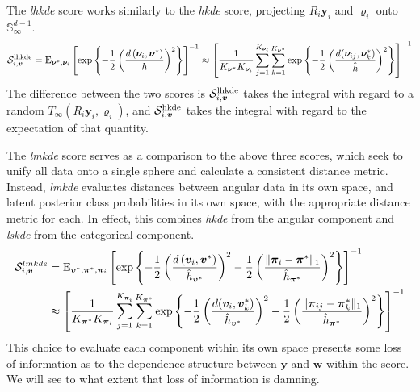     The \emph{lhkde} score works similarly to the \emph{hkde} score, projecting
    $R_i\bm{y}_i$ and $\bm{\varrho}_i$ onto $\mathbb{S}_{\infty}^{d-1}$.  
    \begin{equation}
        \label{eqn:adlhkdecat}
    \mathcal{S}_{i,\bm{v}}^{\text{lhkde}} = \text{E}_{\bm{\nu}^*,\bm{\nu}_i}
        \left[\exp\left\lbrace-\frac{1}{2}\left(
            \frac{d\left(\bm{\nu}_i, \bm{\nu}^*\right)}{h}\right)^2
        \right\rbrace\right]^{-1}
        \approx \left[
        \frac{1}{K_{\bm{\nu}^*}K_{\bm{\nu}_i}}
        \sum_{j = 1}^{K_{\bm{\nu}_i}}\sum_{k=1}^{K_{\bm{\nu}^*}}
        \exp\left\lbrace
        -\frac{1}{2}\left(\frac{d(\bm{\nu}_{ij},\bm{\nu}_k^*)}{\hat{h}}\right)^2
        \right\rbrace\right]^{-1}
    \end{equation}
    The difference between the two scores is $\mathcal{S}_{i,\bm{v}}^{\text{lhkde}}$
    takes the integral with regard to a random 
    $T_{\infty}(R_i\bm{y}_i,\bm{\varrho}_i)$, and $\mathcal{S}_{i,\bm{v}}^{\text{hkde}}$ 
    takes the integral with regard to the expectation of that quantity.

The \emph{lmkde} score serves as a comparison to the above three scores, 
    which seek to unify all data onto a single sphere and calculate a 
    consistent distance metric.  Instead, \emph{lmkde} evaluates distances 
    between angular data in its own space, and latent posterior class 
    probabilities in its own space, with the appropriate distance metric for 
    each.  In effect, this combines \emph{hkde} from
    the angular component and \emph{lskde} from the categorical component.
    \begin{equation}
    \label{eqn:lmkdecat}
    \begin{aligned}
    \mathcal{S}_{i,\bm{v}}^{lmkde} &= \text{E}_{\bm{v}^*,\bm{\pi}^*,\bm{\pi}_i}\left[
        \exp
        \left\lbrace 
        -\frac{1}{2}
        \left(
        \frac{d\left(\bm{v}_i, \bm{v}^*\right)}{\hat{h}_{\bm{v}^*}}
        \right)^2
        -\frac{1}{2}
        \left(
        \frac{\lVert\bm{\pi}_i - \bm{\pi}^*\rVert_1}{\hat{h}_{\bm{\pi}^*}}
        \right)^2
        \right\rbrace
        \right]^{-1}\\
        &\approx \left[\frac{1}{K_{\bm{\pi}^*}K_{\bm{\pi}_i}}
            \sum_{j = 1}^{K_{\bm{\pi}_i}}\sum_{k=1}^{K_{\bm{\pi}^*}}
            \exp\left\lbrace-\frac{1}{2}
            \left(\frac{d(\bm{v}_i,\bm{v}_k^*)}{\hat{h}_{\bm{v}^*}}\right)^2
            -\frac{1}{2}\left(
            \frac{\lVert\bm{\pi}_{ij} - \bm{\pi}_k^*\rVert_1}{\hat{h}_{\bm{\pi}^*}}
            \right)^2
            \right\rbrace\right]^{-1}
    \end{aligned}
    \end{equation}
    This choice to evaluate each component within its own space presents some 
    loss of information as to the dependence structure between $\bm{y}$ and 
    $\bm{w}$ within the score.  We will see to what extent that loss of 
    information is damning.

